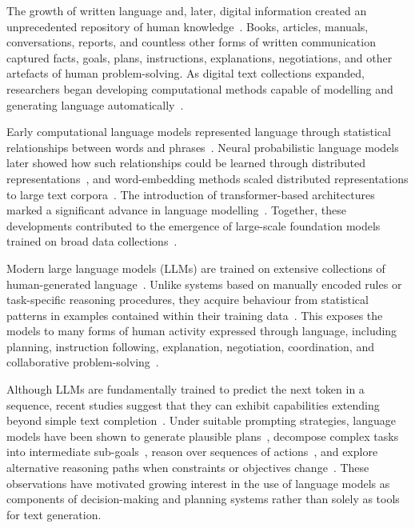The growth of written language and, later, digital information created an unprecedented repository of human knowledge~\cite{fischer2004history}. Books, articles, manuals, conversations, reports, and countless other forms of written communication captured facts, goals, plans, instructions, explanations, negotiations, and other artefacts of human problem-solving. As digital text collections expanded, researchers began developing computational methods capable of modelling and generating language automatically~\cite{jurafsky2025speech}.

Early computational language models represented language through statistical relationships between words and phrases~\cite{jurafsky2025speech}. Neural probabilistic language models later showed how such relationships could be learned through distributed representations~\cite{bengio2003neural}, and word-embedding methods scaled distributed representations to large text corpora~\cite{mikolov2013distributed}. The introduction of transformer-based architectures marked a significant advance in language modelling~\cite{vaswani2017attention}. Together, these developments contributed to the emergence of large-scale foundation models trained on broad data collections~\cite{bommasani2021foundation}.

Modern large language models (LLMs) are trained on extensive collections of human-generated language~\cite{brown2020language,bommasani2021foundation}. Unlike systems based on manually encoded rules or task-specific reasoning procedures, they acquire behaviour from statistical patterns in examples contained within their training data~\cite{brown2020language,bommasani2021foundation}. This exposes the models to many forms of human activity expressed through language, including planning, instruction following, explanation, negotiation, coordination, and collaborative problem-solving~\cite{brown2020language,bommasani2021foundation}.

Although LLMs are fundamentally trained to predict the next token in a sequence, recent studies suggest that they can exhibit capabilities extending beyond simple text completion~\cite{bommasani2021foundation,jurafsky2025speech}. Under suitable prompting strategies, language models have been shown to generate plausible plans~\cite{huang2022lmp}, decompose complex tasks into intermediate sub-goals~\cite{wang2023planandsolve}, reason over sequences of actions~\cite{yao2022react}, and explore alternative reasoning paths when constraints or objectives change~\cite{yao2023tree}. These observations have motivated growing interest in the use of language models as components of decision-making and planning systems rather than solely as tools for text generation.

